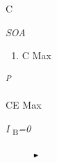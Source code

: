 \documentclass[12pt]{article}
\begin{document}

\par

\begin{adjustwidth}{2.58in}{0.0in}
{\fontsize{4pt}{4.8pt}\selectfont C\par}\par

\end{adjustwidth}

\begin{adjustwidth}{2.79in}{0.0in}
{\fontsize{4pt}{4.8pt}\selectfont \textit{SOA}\par}\par

\end{adjustwidth}

\begin{enumerate}
	\item {\fontsize{3pt}{3.6pt}\selectfont C Max\par}
\end{enumerate}\par


\vspace{\baselineskip}
\begin{adjustwidth}{1.79in}{0.0in}
\begin{Center}
\textit{\textsuperscript{P}}{\fontsize{3pt}{3.6pt}\selectfont CE Max\par}
\end{Center}\par

\end{adjustwidth}


\vspace{\baselineskip}

\vspace{\baselineskip}

\vspace{\baselineskip}
\begin{adjustwidth}{3.82in}{0.0in}
{\fontsize{4pt}{4.8pt}\selectfont \textit{I }\textsubscript{B}\textit{=0}\par}\par

\end{adjustwidth}




\begin{figure}[H]
	\begin{Center}
		\includegraphics[width=0.08in,height=0.06in]{./media/image2.png}
	\end{Center}
\end{figure}
\end{document}
